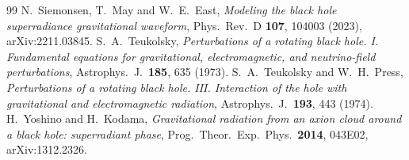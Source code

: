 \documentclass[11pt]{article}
\begin{document}
\begin{thebibliography}{99}
 N.~Siemonsen, T.~May and W.~E.~East, \emph{Modeling the black hole superradiance gravitational waveform}, Phys.\ Rev.\ D \textbf{107}, 104003 (2023), arXiv:2211.03845.
 S.~A.~Teukolsky, \emph{Perturbations of a rotating black hole. I. Fundamental equations for gravitational, electromagnetic, and neutrino-field perturbations}, Astrophys.\ J.\ \textbf{185}, 635 (1973).
 S.~A.~Teukolsky and W.~H.~Press, \emph{Perturbations of a rotating black hole. III. Interaction of the hole with gravitational and electromagnetic radiation}, Astrophys.\ J.\ \textbf{193}, 443 (1974).
 H.~Yoshino and H.~Kodama, \emph{Gravitational radiation from an axion cloud around a black hole: superradiant phase}, Prog.\ Theor.\ Exp.\ Phys.\ \textbf{2014}, 043E02, arXiv:1312.2326.
\end{thebibliography}
\end{document}
